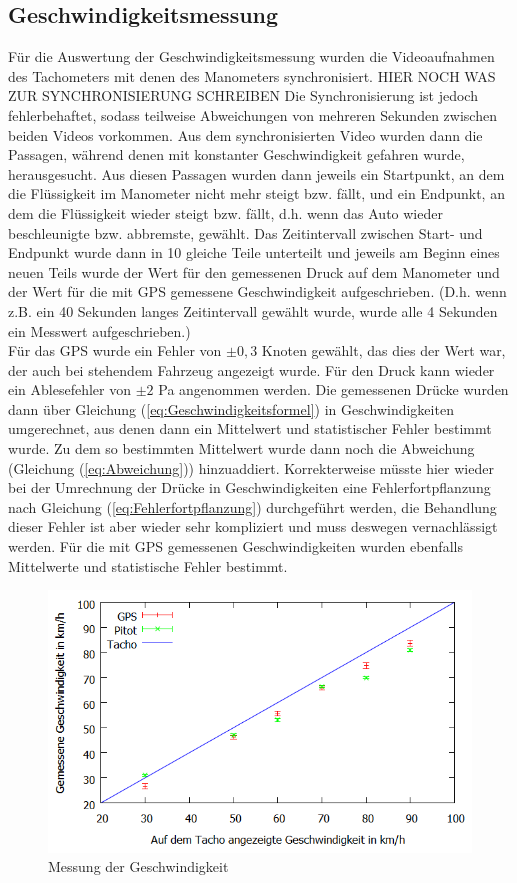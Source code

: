\subsection{Geschwindigkeitsmessung}
Für die Auswertung der Geschwindigkeitsmessung wurden die Videoaufnahmen des Tachometers mit denen des Manometers synchronisiert. HIER NOCH WAS ZUR SYNCHRONISIERUNG SCHREIBEN Die Synchronisierung ist jedoch fehlerbehaftet, sodass teilweise Abweichungen von mehreren Sekunden zwischen beiden Videos vorkommen.
Aus dem synchronisierten Video wurden dann die Passagen, während denen mit konstanter Geschwindigkeit gefahren wurde, herausgesucht. Aus diesen Passagen wurden dann jeweils ein Startpunkt, an dem die Flüssigkeit im Manometer nicht mehr steigt bzw. fällt, und ein Endpunkt, an dem die Flüssigkeit wieder steigt bzw. fällt, d.h. wenn das Auto wieder beschleunigte bzw. abbremste, gewählt. Das Zeitintervall zwischen Start- und Endpunkt wurde dann in 10 gleiche Teile unterteilt und jeweils am Beginn eines neuen Teils wurde der Wert für den gemessenen Druck auf dem Manometer und der Wert für die mit GPS gemessene Geschwindigkeit aufgeschrieben. (D.h. wenn z.B. ein 40 Sekunden langes Zeitintervall gewählt wurde, wurde alle 4 Sekunden ein Messwert aufgeschrieben.)
\\
Für das GPS wurde ein Fehler von $\pm 0,3$ Knoten gewählt, das dies der Wert war, der auch bei stehendem Fahrzeug angezeigt wurde. Für den Druck kann wieder ein Ablesefehler von $\pm 2$ Pa angenommen werden. Die gemessenen Drücke wurden dann über Gleichung (\ref{eq:Geschwindigkeitsformel}) in Geschwindigkeiten umgerechnet, aus denen dann ein Mittelwert und statistischer Fehler bestimmt wurde. Zu dem so bestimmten Mittelwert wurde dann noch die Abweichung (Gleichung (\ref{eq:Abweichung})) hinzuaddiert. Korrekterweise müsste hier wieder bei der Umrechnung der Drücke in Geschwindigkeiten eine Fehlerfortpflanzung nach Gleichung (\ref{eq:Fehlerfortpflanzung}) durchgeführt werden, die Behandlung dieser Fehler ist aber wieder sehr kompliziert und muss deswegen vernachlässigt werden. Für die mit GPS gemessenen Geschwindigkeiten wurden ebenfalls Mittelwerte und statistische Fehler bestimmt.
\\
\begin{figure}
      \includegraphics[width=.9\textwidth]{images/Geschwindigkeit}
\caption{Messung der Geschwindigkeit}
\label{fig:Geschwindigkeit}
\end{figure}
